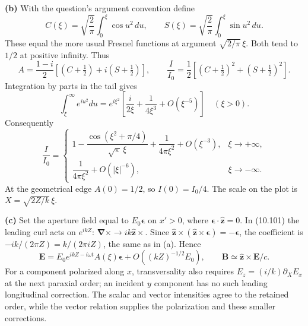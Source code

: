\textbf{(b)} With the question's argument convention define
\[
C(\xi)=\sqrt{\frac2\pi}\int_0^\xi\cos u^2\,du,\qquad
S(\xi)=\sqrt{\frac2\pi}\int_0^\xi\sin u^2\,du .
\]
These equal the more usual Fresnel functions at argument
$\sqrt{2/\pi}\,\xi$. Both tend to $1/2$ at positive infinity.
Thus
\[
A=\frac{1-i}{2}[(C+\tfrac12)+i(S+\tfrac12)],\qquad
\boxed{\frac I{I_0}=\frac12[(C+\tfrac12)^2+(S+\tfrac12)^2].}
\]
Integration by parts in the tail gives
\[
\int_\xi^\infty e^{iu^2}du
=e^{i\xi^2}\left[\frac{i}{2\xi}+\frac1{4\xi^3}
+O(\xi^{-5})\right]\quad(\xi>0).
\]
Consequently
\[
\frac I{I_0}=
\begin{cases}
1-\dfrac{\cos(\xi^2+\pi/4)}{\sqrt\pi\,\xi}
+\dfrac1{4\pi\xi^2}+O(\xi^{-3}),&\xi\to+\infty,\\[6pt]
\dfrac1{4\pi\xi^2}+O(|\xi|^{-6}),&\xi\to-\infty .
\end{cases}
\]
At the geometrical edge $A(0)=1/2$, so $I(0)=I_0/4$.
The scale on the plot is $X=\sqrt{2Z/k}\,\xi$.
\begin{center}\end{center}

\textbf{(c)} Set the aperture field equal to
$E_0\boldsymbol\epsilon$ on $x'>0$, where
$\boldsymbol\epsilon\cdot\widehat{\mathbf z}=0$.
In (10.101) the leading curl acts on $e^{ikZ}$:
$\boldsymbol\nabla\times\to ik\widehat{\mathbf z}\times$.
Since $\widehat{\mathbf z}\times
(\widehat{\mathbf z}\times\boldsymbol\epsilon)=-\boldsymbol\epsilon$,
the coefficient is $-ik/(2\pi Z)=k/(2\pi iZ)$, the same as in (a).
Hence
\[
\mathbf E=E_0e^{ikZ-i\omega t}A(\xi)\boldsymbol\epsilon
+O((kZ)^{-1/2}E_0),\qquad
\mathbf B\simeq\widehat{\mathbf z}\times\mathbf E/c .
\]
For a component polarized along $x$, transversality also requires
$E_z=(i/k)\partial_X E_x$ at the next paraxial order; an incident
$y$ component has no such leading longitudinal correction.
The scalar and vector intensities agree to the retained order, while the
vector relation supplies the polarization and these smaller corrections.

